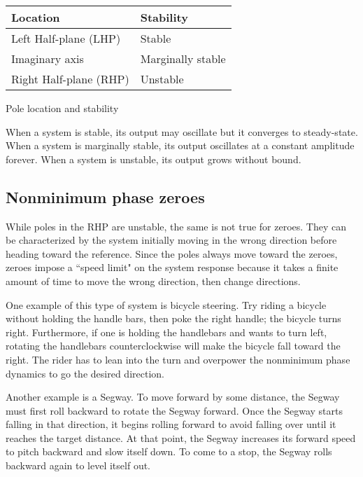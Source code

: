 \begin{booktable}
  \begin{tabular}{|ll|}
    \hline
    \rowcolor{headingbg}
    \textbf{Location} & \textbf{Stability} \\
    \hline
    Left Half-plane (LHP) & Stable \\
    Imaginary axis & Marginally stable \\
    Right Half-plane (RHP) & Unstable \\
    \hline
  \end{tabular}

  \caption{Pole location and stability}
\end{booktable}

When a \gls{system} is stable, its output may oscillate but it converges to
steady-state. When a \gls{system} is marginally stable, its output oscillates at
a constant amplitude forever. When a \gls{system} is unstable, its output grows
without bound.

\subsection{Nonminimum phase zeroes}

While poles in the RHP are unstable, the same is not true for zeroes. They can
be characterized by the \gls{system} initially moving in the wrong direction
before heading toward the \gls{reference}. Since the poles always move toward
the zeroes, zeroes impose a ``speed limit" on the \gls{system response} because
it takes a finite amount of time to move the wrong direction, then change
directions.

One example of this type of \gls{system} is bicycle steering. Try riding a
bicycle without holding the handle bars, then poke the right handle; the bicycle
turns right. Furthermore, if one is holding the handlebars and wants to turn
left, rotating the handlebars counterclockwise will make the bicycle fall toward
the right. The rider has to lean into the turn and overpower the nonminimum
phase dynamics to go the desired direction.

Another example is a Segway. To move forward by some distance, the Segway must
first roll backward to rotate the Segway forward. Once the Segway starts falling
in that direction, it begins rolling forward to avoid falling over until
it reaches the target distance. At that point, the Segway increases its forward
speed to pitch backward and slow itself down. To come to a stop, the Segway
rolls backward again to level itself out.

